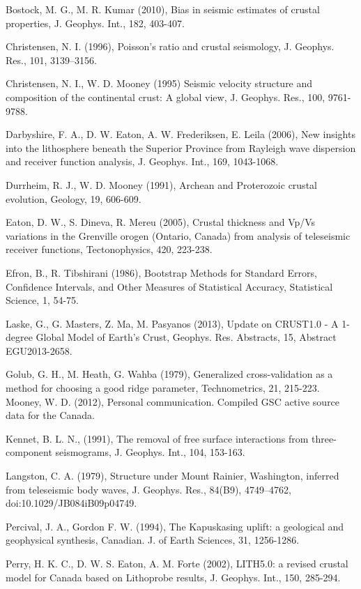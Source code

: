 \documentclass[draft, 12pt]{article}
\begin{document}
Bostock, M. G., M. R. Kumar (2010), Bias in seismic estimates of crustal properties, J. Geophys. Int., 182, 403-407.

Christensen, N. I. (1996), Poisson's ratio and crustal seismology, J. Geophys. Res., 101, 3139–3156.

Christensen, N. I., W. D. Mooney (1995) Seismic velocity structure and composition of the continental crust: A global view, J. Geophys. Res., 100, 9761-9788.

Darbyshire, F. A., D. W. Eaton, A. W. Frederiksen, E. Leila (2006), New insights into the lithosphere beneath the Superior Province from Rayleigh wave dispersion and receiver function analysis, J. Geophys. Int., 169, 1043-1068.

Durrheim, R. J., W. D. Mooney (1991), Archean and Proterozoic crustal evolution, Geology, 19, 606-609.

Eaton, D. W., S. Dineva, R. Mereu (2005), Crustal thickness and Vp/Vs variations in the Grenville orogen (Ontario, Canada) from analysis of teleseismic receiver functions, Tectonophysics, 420, 223-238.

Efron, B., R. Tibshirani (1986), Bootstrap Methods for Standard Errors, Confidence Intervals, and Other Measures of Statistical Accuracy, Statistical Science, 1, 54-75.

Laske, G., G. Masters, Z. Ma, M. Pasyanos (2013), Update on CRUST1.0 - A 1-degree Global Model of Earth's Crust, Geophys. Res. Abstracts, 15, Abstract EGU2013-2658.

Golub, G. H., M. Heath, G. Wahba (1979), Generalized cross-validation as a method for choosing a good ridge parameter, Technometrics, 21, 215-223.
Mooney, W. D. (2012), Personal communication. Compiled GSC active source data for the Canada.

Kennet, B. L. N., (1991), The removal of free surface interactions from three-component seismograms, J. Geophys. Int., 104, 153-163.

Langston, C. A. (1979), Structure under Mount Rainier, Washington, inferred from teleseismic body waves, J. Geophys. Res., 84(B9), 4749–4762, doi:10.1029/JB084iB09p04749.

Percival, J. A., Gordon F. W. (1994), The Kapuskasing uplift: a geological and geophysical synthesis, Canadian. J. of Earth Sciences, 31, 1256-1286.

Perry, H. K. C., D. W. S. Eaton, A. M. Forte (2002), LITH5.0: a revised crustal model for Canada based on Lithoprobe results,  J. Geophys. Int., 150, 285-294.
\end{document}
